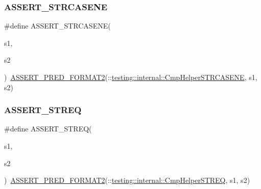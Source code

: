 \mbox{\label{googletest-master_2googletest_2include_2gtest_2gtest_8h_ac3d2c3836b103068a050f32585b2aaad}} 
\subsubsection{\texorpdfstring{ASSERT\_STRCASENE}{ASSERT\_STRCASENE}}
{\footnotesize\ttfamily \#define A\+S\+S\+E\+R\+T\+\_\+\+S\+T\+R\+C\+A\+S\+E\+NE(\begin{DoxyParamCaption}\item[{}]{s1,  }\item[{}]{s2 }\end{DoxyParamCaption})~\mbox{\hyperlink{_obj__test_2lib_2googletest-release-1_88_81_2googletest_2include_2gtest_2gtest__pred__impl_8h_ac452685a1a98ea3d96eb956a062ee210}{A\+S\+S\+E\+R\+T\+\_\+\+P\+R\+E\+D\+\_\+\+F\+O\+R\+M\+A\+T2}}(\+::\mbox{\hyperlink{namespacetesting_1_1internal_a7e31d489f06ab8f6a81a7729f0c377e7}{testing\+::internal\+::\+Cmp\+Helper\+S\+T\+R\+C\+A\+S\+E\+NE}}, s1, s2)}

\mbox{\label{googletest-master_2googletest_2include_2gtest_2gtest_8h_a74f4189ea570bab9a65d47104659ef9c}} 
\subsubsection{\texorpdfstring{ASSERT\_STREQ}{ASSERT\_STREQ}}
{\footnotesize\ttfamily \#define A\+S\+S\+E\+R\+T\+\_\+\+S\+T\+R\+EQ(\begin{DoxyParamCaption}\item[{}]{s1,  }\item[{}]{s2 }\end{DoxyParamCaption})~\mbox{\hyperlink{_obj__test_2lib_2googletest-release-1_88_81_2googletest_2include_2gtest_2gtest__pred__impl_8h_ac452685a1a98ea3d96eb956a062ee210}{A\+S\+S\+E\+R\+T\+\_\+\+P\+R\+E\+D\+\_\+\+F\+O\+R\+M\+A\+T2}}(\+::\mbox{\hyperlink{namespacetesting_1_1internal_a711a396ed8f636ecd14a850a89d181b6}{testing\+::internal\+::\+Cmp\+Helper\+S\+T\+R\+EQ}}, s1, s2)}

\mbox{\label{googletest-master_2googletest_2include_2gtest_2gtest_8h_a3d679660ac1b2f9f6e6c7608452af923}} 
